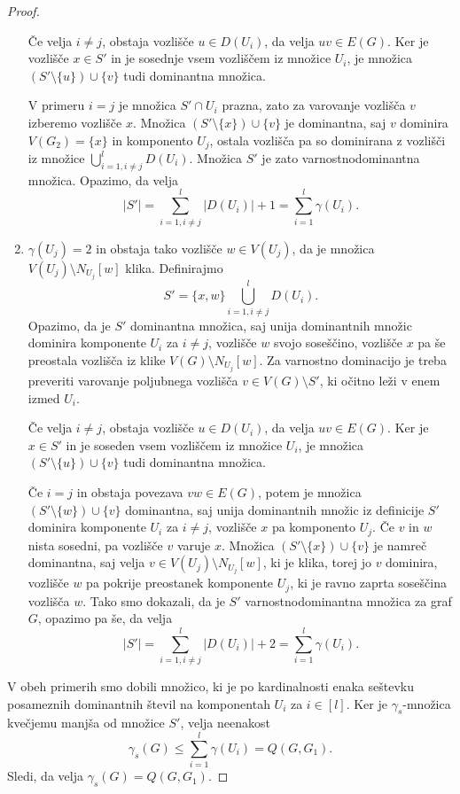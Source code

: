 \documentclass[12pt,a4paper,twoside]{article}
\theoremstyle{definition} %
\theoremstyle{plain} %
\numberwithin{equation}{section}  %
\begin{document}
\begin{proof}
\begin{enumerate}[label=($\roman*$)]
Če velja $i\neq j$, obstaja vozlišče $u \in D(U_i)$, da velja $uv \in E(G)$. Ker je vozlišče $x \in S'$ in je sosednje vsem vozliščem iz množice $U_i$, je množica $(S' \setminus \{u\}) \cup\{v\}$ tudi dominantna množica.

V primeru $i=j$ je množica $S' \cap U_i$ prazna, zato za varovanje vozlišča $v$ izberemo vozlišče $x$. Množica $(S' \setminus \{x\}) \cup \{v\}$ je dominantna, saj $v$ dominira $V(G_2) = \{x\}$ in komponento $U_j$, ostala vozlišča pa so dominirana z vozlišči iz množice $\bigcup_{i = 1, i \neq j}^l D(U_i)$. Množica $S'$ je zato varnostnodominantna množica. Opazimo, da velja $$|S'| = \sum_{i=1, i\neq j}^l|D(U_i)|+ 1= \sum_{i=1}^l\gamma(U_i).$$

\item $\gamma(U_j) = 2$ in obstaja tako vozlišče $w \in V(U_j)$, da je množica $V(U_j) \setminus N_{U_j}[w]$ klika. Definirajmo $$S' = \{x, w\} \bigcup\limits_{i = 1, i \neq j}^l D(U_i).$$Opazimo, da je $S'$ dominantna množica, saj unija dominantnih množic dominira komponente $U_i$ za $i \neq j$, vozlišče $w$ svojo soseščino, vozlišče $x$ pa še preostala vozlišča iz klike $V(G) \setminus N_{U_j}[w]$. Za varnostno dominacijo je treba preveriti varovanje poljubnega vozlišča $v \in V(G) \setminus S'$, ki očitno leži v enem izmed $U_i$.

Če velja $i\neq j$, obstaja vozlišče $u \in D(U_i)$, da velja $uv \in E(G)$. Ker je $x \in S'$ in je soseden vsem vozliščem iz množice $U_i$, je množica $(S' \setminus \{u\}) \cup\{v\}$ tudi dominantna množica.

Če $i=j$ in obstaja povezava $vw \in E(G)$, potem je množica $(S' \setminus \{w\}) \cup \{v\}$ dominantna, saj unija dominantnih množic iz definicije $S'$ dominira komponente $U_i$ za $i\neq j$, vozlišče $x$ pa komponento $U_j$. Če $v$ in $w$ nista sosedni, pa vozlišče $v$ varuje $x$. Množica $(S' \setminus \{x\}) \cup \{v\}$ je namreč dominantna, saj velja $v \in V(U_j) \setminus N_{U_j}[w]$, ki je klika, torej jo $v$ dominira, vozlišče $w$ pa pokrije preostanek komponente $U_j$, ki je ravno zaprta soseščina vozlišča $w$. Tako smo dokazali, da je $S'$ varnostnodominantna množica za graf $G$, opazimo pa še, da velja$$|S'| = \sum_{i=1, i\neq j}^l|D(U_i)|+ 2= \sum_{i=1}^l\gamma(U_i).$$
\end{enumerate}
V obeh primerih smo dobili množico, ki je po kardinalnosti enaka seštevku posameznih dominantnih števil na komponentah $U_i$ za $i \in [l]$. Ker je $\gamma_s$-množica kvečjemu manjša od množice $S'$, velja neenakost $$\gamma_s(G) \leq \sum\limits_{i = 1}^l\gamma(U_i)  = Q(G, G_1).$$
Sledi, da velja $\gamma_s(G)  = Q(G, G_1)$.
\end{proof}
\end{document}
